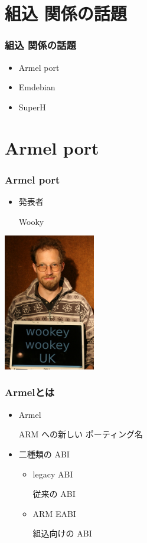 \documentclass[cjk,dvipdfmx,12pt]{beamer}
\begin{document}
\section{組込 関係の話題}
\begin{frame}
\frametitle{組込 関係の話題}
\begin{itemize}
\item Armel port
\item Emdebian
\item SuperH
\end{itemize}
\end{frame}

\section{Armel port}
\begin{frame}
\frametitle{Armel port} 
  \begin{minipage}{0.45\hsize}
    \begin{itemize}
      \item 発表者

	Wooky
    \end{itemize}
  \end{minipage}
  \begin{minipage}{0.45\hsize}
    \includegraphics[width=4cm]{image200707/wookey.jpg}
  \end{minipage}

\end{frame}

\begin{frame}
\frametitle{Armelとは} 
\begin{itemize}
  \item Armel

     ARM への新しい ポーティング名 

  \item 二種類の ABI
    \begin{itemize}
	\item legacy ABI

	  従来の ABI
        \item ARM EABI

	  組込向けの ABI 
    \end{itemize}
\end{itemize}
\end{frame}
\end{document}
